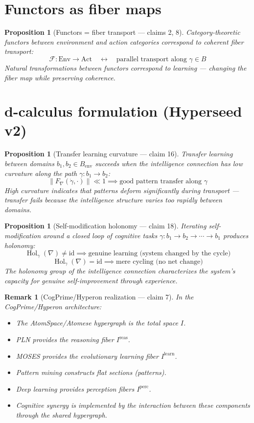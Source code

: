 \documentclass[11pt,a4paper]{article}
\newtheorem{proposition}[definition]{Proposition}
\newtheorem{remark}[definition]{Remark}
\begin{document}
\section{Functors as fiber maps}

\begin{proposition}[Functors = fiber transport --- claims 2, 8]
Category-theoretic functors between environment and action categories
correspond to coherent fiber transport:
\[
  \mathcal{F}: \text{Env} \to \text{Act} \quad \leftrightarrow \quad
  \text{parallel transport along } \gamma \in B
\]
Natural transformations between functors correspond to learning ---
changing the fiber map while preserving coherence.
\end{proposition}

\section{d-calculus formulation (Hyperseed v2)}

\begin{proposition}[Transfer learning curvature --- claim 16]
\label{prop:transfer}
Transfer learning between domains $b_1, b_2 \in B_{\text{env}}$ succeeds
when the intelligence connection has low curvature along the path
$\gamma: b_1 \to b_2$:
\[
  \|F_\nabla(\dot\gamma, \cdot)\| \ll 1
  \implies \text{good pattern transfer along } \gamma
\]
High curvature indicates that patterns deform significantly during
transport --- transfer fails because the intelligence structure varies
too rapidly between domains.
\end{proposition}

\begin{proposition}[Self-modification holonomy --- claim 18]
\label{prop:holonomy}
Iterating self-modification around a closed loop of cognitive tasks
$\gamma: b_1 \to b_2 \to \cdots \to b_1$ produces holonomy:
\[
  \operatorname{Hol}_\gamma(\nabla) \neq \mathrm{id}
  \implies \text{genuine learning (system changed by the cycle)}
\]
\[
  \operatorname{Hol}_\gamma(\nabla) = \mathrm{id}
  \implies \text{mere cycling (no net change)}
\]
The holonomy group of the intelligence connection characterizes the
system's capacity for genuine self-improvement through experience.
\end{proposition}

\begin{remark}[CogPrime/Hyperon realization --- claim 7]
In the CogPrime/Hyperon architecture:
\begin{itemize}
  \item The AtomSpace/Atomese hypergraph is the total space $I$.
  \item PLN provides the reasoning fiber $I^{\text{reas}}$.
  \item MOSES provides the evolutionary learning fiber $I^{\text{learn}}$.
  \item Pattern mining constructs flat sections (patterns).
  \item Deep learning provides perception fibers $I^{\text{perc}}$.
  \item Cognitive synergy is implemented by the interaction between these
    components through the shared hypergraph.
\end{itemize}
\end{remark}
\end{document}

